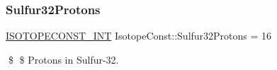 \subsubsection{\texorpdfstring{Sulfur32\+Protons}{Sulfur32Protons}}
{\footnotesize\ttfamily \mbox{\hyperlink{group___isotope_const-_macros_ga5f18360b3e99483a35c32d789e62621c}{I\+S\+O\+T\+O\+P\+E\+C\+O\+N\+S\+T\+\_\+\+I\+NT}} Isotope\+Const\+::\+Sulfur32\+Protons = 16}

\$ \$ Protons in Sulfur-\/32. 